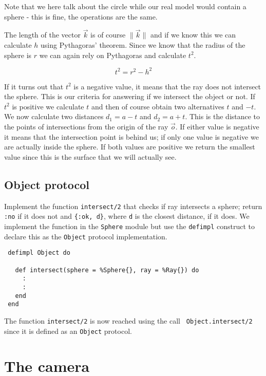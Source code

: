 \documentclass[a4paper,11pt]{article}
\begin{document}
Note that we here talk about the circle while our real model would
contain a sphere - this is fine, the operations are the same.


The length of the vector $\vec{k}$ is of course $\|\vec{k}\|$
and if we know this we can calculate $h$
using Pythagoras' theorem. Since we know that the radius of the
sphere is $r$ we can again rely on Pythagoras and calculate $t^2$.

$$ t^2 = r^2 - h^2 $$

If it turns out that $t^2$ is a negative value, it means that the ray
does not intersect the sphere. This is our criteria for answering if
we intersect the object or not. If $t^2$ is positive we calculate $t$
and then of course obtain two alternatives $t$ and $-t$.  We now
calculate two distances $d_1 = a - t$ and $d_2 = a + t$.  This is the
distance to the points of intersections from the origin of the ray
$\vec{o}$.  If either value is negative it means that the intersection
point is behind us; if only one value is negative we are actually
inside the sphere. If both values are positive we return the smallest
value since this is the surface that we will actually see.

\subsection*{Object protocol}

Implement the function {\tt intersect/2} that checks if ray intersects
a sphere; return {\tt :no} if it does not and {\tt \{:ok, d\}}, where
{\tt d} is the closest distance, if it does. We implement the function
in the {\tt Sphere} module but use the {\tt defimpl} construct to
declare this as the {\tt Object} protocol implementation.

\begin{verbatim}
 defimpl Object do

   def intersect(sphere = %Sphere{}, ray = %Ray{}) do
     :
     :
   end
 end
\end{verbatim}

 The function {\tt intersect/2} is now reached using the call {\tt
   Object.intersect/2} since it is defined as an {\tt Object}
 protocol.

 


\section{The camera}
\end{document}
